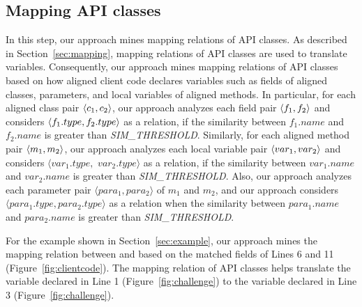 \subsection{Mapping API classes}
\label{sec:approach:mappingtypes}

In this step, our approach mines mapping relations of
API classes. As described in Section~\ref{sec:mapping}, mapping relations of API classes are used
to translate variables. Consequently, our approach mines mapping
relations of API classes based on how aligned client code declares
variables such as fields of aligned classes, parameters, and local variables of aligned methods. In
particular, for each aligned class pair $\langle c_1, c_2 \rangle$, our
approach analyzes each field pair $\langle f_1, f_2 \rangle$ and considers
$\langle f_1.type, f_2.type \rangle$ as a relation, if the similarity between $f_1.name$ and $f_2.name$ is
greater than \emph{SIM\_THRESHOLD}. Similarly, for each aligned method pair
$\langle m_1, m_2 \rangle$, our approach analyzes each local variable pair
$\langle var_1, var_2 \rangle$ and considers $\langle var_1.type,$ $
var_2.type\rangle$ as a relation, if the similarity between
$var_1.name$ and $var_2.name$ is greater than
\emph{SIM\_THRESHOLD}. Also, our approach analyzes each parameter pair
$\langle para_1, para_2\rangle$ of $m_1$ and $m_2$, and our
approach considers $\langle para_1.type, para_2.type\rangle$ as
a relation when the similarity between $para_1.name$ and $para_2.name$ is greater than \emph{SIM\_THRESHOLD}.

For the example shown in Section~\ref{sec:example}, our approach
mines the mapping relation between  and
 based on the matched fields of Lines 6
and 11 (Figure~\ref{fig:clientcode}). The mapping relation of API
classes helps translate the variable declared in Line 1
(Figure~\ref{fig:challenge}) to the variable declared in Line 3
(Figure~\ref{fig:challenge}).


